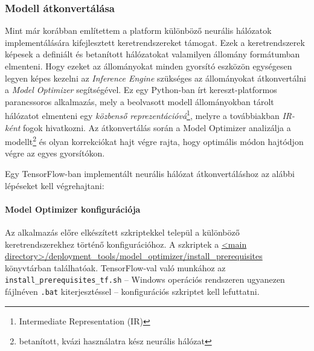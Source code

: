 \subsubsection{Modell átkonvertálása}
Mint már korábban említettem a platform különböző neurális hálózatok implementálására kifejlesztett keretrendszereket támogat. Ezek a keretrendszerek képesek a definiált és betanított hálózatokat valamilyen állomány formátumban elmenteni. Hogy ezeket az állományokat minden gyorsító eszközön egységesen legyen képes kezelni az \emph{Inference Engine} szükséges az állományokat átkonvertálni a \emph{Model Optimizer} segítségével. Ez egy Python-ban írt kereszt-platformos parancssoros alkalmazás, mely a beolvasott modell állományokban tárolt hálózatot elmenteni egy \emph{közbenső reprezentációvá}\footnote{Intermediate Representation (IR)}, melyre a továbbiakban \emph{IR-ként} fogok hivatkozni. Az átkonvertálás során a Model Optimizer analizálja a modellt\footnote{betanított, kvázi használatra kész neurális hálózat} és olyan korrekciókat hajt végre rajta, hogy optimális módon hajtódjon végre az egyes gyorsítókon. 

Egy TensorFlow-ban implementált neurális hálózat átkonvertáláshoz az alábbi lépéseket kell végrehajtani:
\paragraph*{Model Optimizer konfigurációja}
	Az alkalmazás előre elkészített szkriptekkel települ a különböző keretrendszerekhez történő konfigurációhoz. A szkriptek a \url{<main directory>/deployment_tools/model_optimizer/install_prerequisites} könyvtárban találhatóak. TensorFlow-val való munkához az \verb|install_prerequisites_tf.sh| -- Windows operációs rendszeren ugyanezen fájlnéven \verb|.bat| kiterjesztéssel -- konfigurációs szkriptet kell lefuttatni.

